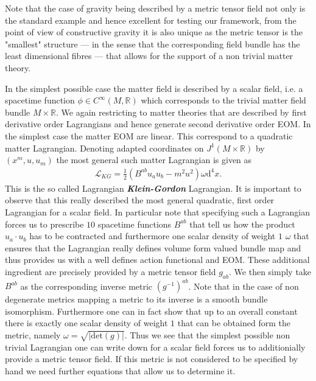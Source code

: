 \documentclass[a4paper,12pt, DIV=14, BCOR=5mm, twoside, headsepline]{scrbook}
\begin{document}
Note that the case of gravity being described by a metric tensor field not only is the standard example and hence excellent for testing our framework, from the point of view of constructive gravity it is also unique as the metric tensor is the "smallest" structure --- in the sense that the corresponding field bundle has the least dimensional fibres --- that allows for the support of a non trivial matter theory.

In the simplest possible case the matter field is described by a scalar field, i.e. a spacetime function $\phi \in C^{\infty}(M,\mathbb{R})$ which corresponds to the trivial matter field bundle $M \times \mathbb{R}$. We again restricting to matter theories that are described by first derivative order Lagrangians and hence generate second derivative order EOM. In the simplest case the matter EOM are linear. This correspond to a quadratic matter Lagrangian. Denoting adapted coordinates on $J^1(M \times \mathbb{R})$ by $(x^m,u,u_m)$ the most general such matter Lagrangian is given as
\begin{align}\label{KGL}
    \mathcal{L}_{KG} = \frac{1}{2} \left ( B^{ab} u_a u_b - m^2 u^2\right )\omega \mathrm{d}^4x.
\end{align}
This is the so called Lagrangian \textit{\textbf{Klein-Gordon}} Lagrangian. It is important to observe that this really described the most general quadratic, first order Lagrangian for a scalar field. 
In particular note that specifying such a Lagrangian forces us to prescribe $10$ spacetime functions $B^{ab}$ that tell us how the product $u_a\cdot u_b$ has to be contracted and furthermore one scalar density of weight $1$ $\omega$ that ensures that the Lagrangian really defines volume form valued bundle map and thus provides us with a well defines action functional and EOM.
These additional ingredient are precisely provided by a metric tensor field $g_{ab}$. We then simply take $B^{ab}$ as the corresponding inverse metric $(g^{-1})^{ab}$. Note that in the case of non degenerate metrics mapping a metric to its inverse is a smooth bundle isomorphism. Furthermore one can in fact show that up to an overall constant there is exactly one scalar density of weight $1$ that can be obtained form the metric, namely $\omega = \sqrt{ \vert \mathrm{det}(g) \vert }$. 
Thus we see that the simplest possible non trivial Lagrangian one can write down for a scalar field forces us to additionially provide a metric tensor field. If this metric is not considered to be specified by hand we need further equations that allow us to determine it.  
\end{document}
